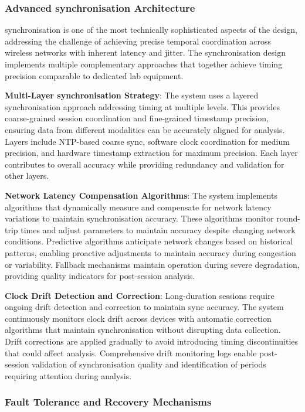 \documentclass[11pt,a4paper]{report}
\begin{document}
\subsubsection{Advanced synchronisation Architecture}

synchronisation is one of the most technically sophisticated aspects of the design, addressing the challenge of achieving precise temporal coordination across wireless networks with inherent latency and jitter. The synchronisation design implements multiple complementary approaches that together achieve timing precision comparable to dedicated lab equipment.

\textbf{Multi-Layer synchronisation Strategy}: The system uses a layered synchronisation approach addressing timing at multiple levels. This provides coarse-grained session coordination and fine-grained timestamp precision, ensuring data from different modalities can be accurately aligned for analysis. Layers include NTP-based coarse sync, software clock coordination for medium precision, and hardware timestamp extraction for maximum precision. Each layer contributes to overall accuracy while providing redundancy and validation for other layers.

\textbf{Network Latency Compensation Algorithms}: The system implements algorithms that dynamically measure and compensate for network latency variations to maintain synchronisation accuracy. These algorithms monitor round-trip times and adjust parameters to maintain accuracy despite changing network conditions. Predictive algorithms anticipate network changes based on historical patterns, enabling proactive adjustments to maintain accuracy during congestion or variability. Fallback mechanisms maintain operation during severe degradation, providing quality indicators for post-session analysis.

\textbf{Clock Drift Detection and Correction}: Long-duration sessions require ongoing drift detection and correction to maintain sync accuracy. The system continuously monitors clock drift across devices with automatic correction algorithms that maintain synchronisation without disrupting data collection. Drift corrections are applied gradually to avoid introducing timing discontinuities that could affect analysis. Comprehensive drift monitoring logs enable post-session validation of synchronisation quality and identification of periods requiring attention during analysis.

\subsubsection{Fault Tolerance and Recovery Mechanisms}
\end{document}
